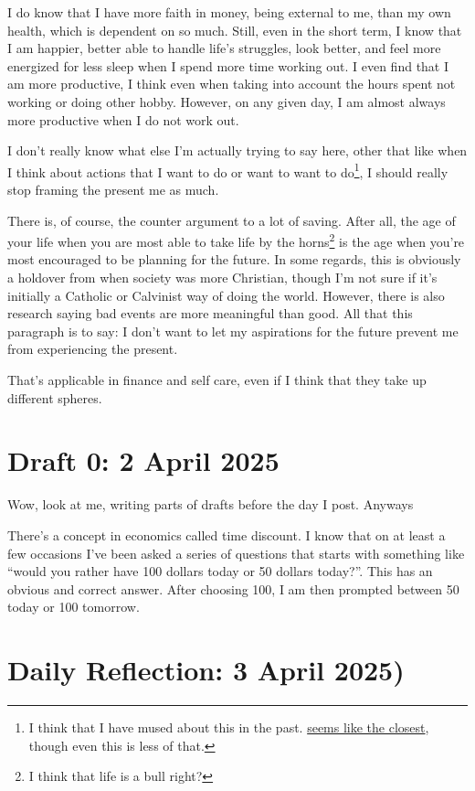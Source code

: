 \documentclass[12pt]{article}[titlepage]
\newcommand{\say}[1]{``#1''}
\newcommand{\1}{\={a}}
\newcommand{\2}{\={e}}
\newcommand{\3}{\={\i}}
\newcommand{\4}{\=o}
\newcommand{\5}{\=u}
\newcommand{\6}{\={A}}
\renewcommand{\,}{\textsuperscript{,}}
\begin{document}
I do know that I have more faith in money, being external to me, than my own health, which is dependent on so much.  
Still, even in the short term, I know that I am happier, better able to handle life's struggles, look better, and feel more energized for less sleep when I spend more time working out.  
I even find that I am more productive, I think even when taking into account the hours spent not working or doing other hobby.  
However, on any given day, I am almost always more productive when I do not work out.

I don't really know what else I'm actually trying to say here, other that like when I think about actions that I want to do or want to want to do\footnote{I think that I have mused about this in the past. \href{do-versus-done}{seems like the closest}, though even this is less of that.}, I should really stop framing the present me as much.

There is, of course, the counter argument to a lot of saving.  
After all, the age of your life when you are most able to take life by the horns\footnote{I think that life is a bull right?} is the age when you're most encouraged to be planning for the future.  
In some regards, this is obviously a holdover from when society was more Christian, though I'm not sure if it's initially a Catholic or Calvinist way of doing the world.  
However, there is also research saying bad events are more meaningful than good.  
All that this paragraph is to say: I don't want to let my aspirations for the future prevent me from experiencing the present.

That's applicable in finance and self care, even if I think that they take up different spheres.

\section{Draft 0: 2 April 2025}  
Wow, look at me, writing parts of drafts before the day I post.  
Anyways

There's a concept in economics called time discount.  
I know that on at least a few occasions I've been asked a series of questions that starts with something like \say{would you rather have 100 dollars today or 50 dollars today?}.  
This has an obvious and correct answer.  
After choosing 100, I am then prompted between 50 today or 100 tomorrow.

\section{Daily Reflection: 3 April 2025)}
\end{document}
